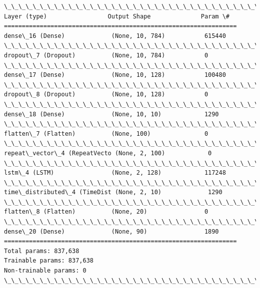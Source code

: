 \documentclass[11pt]{article}
\begin{document}
    \begin{Verbatim}[commandchars=\\\{\}]
\_\_\_\_\_\_\_\_\_\_\_\_\_\_\_\_\_\_\_\_\_\_\_\_\_\_\_\_\_\_\_\_\_\_\_\_\_\_\_\_\_\_\_\_\_\_\_\_\_\_\_\_\_\_\_\_\_\_\_\_\_\_\_\_\_
Layer (type)                 Output Shape              Param \#   
=================================================================
dense\_16 (Dense)             (None, 10, 784)           615440    
\_\_\_\_\_\_\_\_\_\_\_\_\_\_\_\_\_\_\_\_\_\_\_\_\_\_\_\_\_\_\_\_\_\_\_\_\_\_\_\_\_\_\_\_\_\_\_\_\_\_\_\_\_\_\_\_\_\_\_\_\_\_\_\_\_
dropout\_7 (Dropout)          (None, 10, 784)           0         
\_\_\_\_\_\_\_\_\_\_\_\_\_\_\_\_\_\_\_\_\_\_\_\_\_\_\_\_\_\_\_\_\_\_\_\_\_\_\_\_\_\_\_\_\_\_\_\_\_\_\_\_\_\_\_\_\_\_\_\_\_\_\_\_\_
dense\_17 (Dense)             (None, 10, 128)           100480    
\_\_\_\_\_\_\_\_\_\_\_\_\_\_\_\_\_\_\_\_\_\_\_\_\_\_\_\_\_\_\_\_\_\_\_\_\_\_\_\_\_\_\_\_\_\_\_\_\_\_\_\_\_\_\_\_\_\_\_\_\_\_\_\_\_
dropout\_8 (Dropout)          (None, 10, 128)           0         
\_\_\_\_\_\_\_\_\_\_\_\_\_\_\_\_\_\_\_\_\_\_\_\_\_\_\_\_\_\_\_\_\_\_\_\_\_\_\_\_\_\_\_\_\_\_\_\_\_\_\_\_\_\_\_\_\_\_\_\_\_\_\_\_\_
dense\_18 (Dense)             (None, 10, 10)            1290      
\_\_\_\_\_\_\_\_\_\_\_\_\_\_\_\_\_\_\_\_\_\_\_\_\_\_\_\_\_\_\_\_\_\_\_\_\_\_\_\_\_\_\_\_\_\_\_\_\_\_\_\_\_\_\_\_\_\_\_\_\_\_\_\_\_
flatten\_7 (Flatten)          (None, 100)               0         
\_\_\_\_\_\_\_\_\_\_\_\_\_\_\_\_\_\_\_\_\_\_\_\_\_\_\_\_\_\_\_\_\_\_\_\_\_\_\_\_\_\_\_\_\_\_\_\_\_\_\_\_\_\_\_\_\_\_\_\_\_\_\_\_\_
repeat\_vector\_4 (RepeatVecto (None, 2, 100)            0         
\_\_\_\_\_\_\_\_\_\_\_\_\_\_\_\_\_\_\_\_\_\_\_\_\_\_\_\_\_\_\_\_\_\_\_\_\_\_\_\_\_\_\_\_\_\_\_\_\_\_\_\_\_\_\_\_\_\_\_\_\_\_\_\_\_
lstm\_4 (LSTM)                (None, 2, 128)            117248    
\_\_\_\_\_\_\_\_\_\_\_\_\_\_\_\_\_\_\_\_\_\_\_\_\_\_\_\_\_\_\_\_\_\_\_\_\_\_\_\_\_\_\_\_\_\_\_\_\_\_\_\_\_\_\_\_\_\_\_\_\_\_\_\_\_
time\_distributed\_4 (TimeDist (None, 2, 10)             1290      
\_\_\_\_\_\_\_\_\_\_\_\_\_\_\_\_\_\_\_\_\_\_\_\_\_\_\_\_\_\_\_\_\_\_\_\_\_\_\_\_\_\_\_\_\_\_\_\_\_\_\_\_\_\_\_\_\_\_\_\_\_\_\_\_\_
flatten\_8 (Flatten)          (None, 20)                0         
\_\_\_\_\_\_\_\_\_\_\_\_\_\_\_\_\_\_\_\_\_\_\_\_\_\_\_\_\_\_\_\_\_\_\_\_\_\_\_\_\_\_\_\_\_\_\_\_\_\_\_\_\_\_\_\_\_\_\_\_\_\_\_\_\_
dense\_20 (Dense)             (None, 90)                1890      
=================================================================
Total params: 837,638
Trainable params: 837,638
Non-trainable params: 0
\_\_\_\_\_\_\_\_\_\_\_\_\_\_\_\_\_\_\_\_\_\_\_\_\_\_\_\_\_\_\_\_\_\_\_\_\_\_\_\_\_\_\_\_\_\_\_\_\_\_\_\_\_\_\_\_\_\_\_\_\_\_\_\_\_

    \end{Verbatim}
\end{document}
